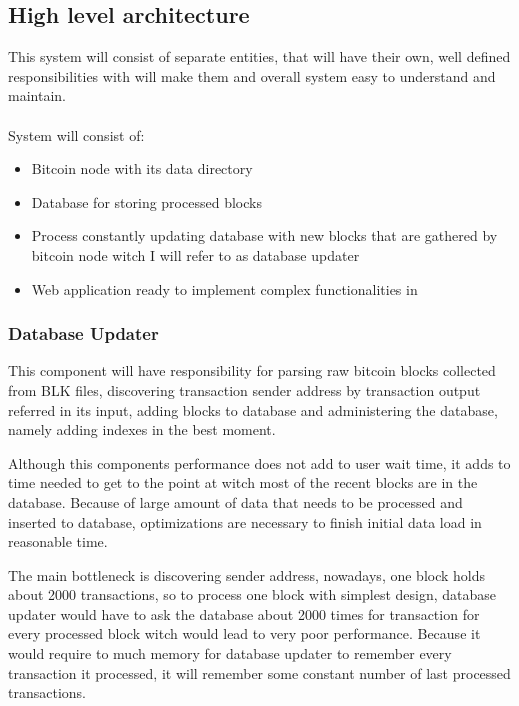 \documentclass[12pt, en, eng]{mgr}
\begin{document}
\subsection{High level architecture}
This system will consist of separate entities, that will have their own, well defined responsibilities with will make them and overall system easy to understand and maintain.
\\
\\
System will consist of:
\begin{itemize}
\item
Bitcoin node with its data directory
\item
Database for storing processed blocks
\item
Process constantly updating database with new blocks that are gathered by bitcoin node witch I will refer to as database updater
\item
Web application ready to implement complex functionalities in
\end{itemize}

\subsubsection{Database Updater}
This component will have responsibility for parsing raw bitcoin blocks collected from BLK files, discovering transaction sender address by transaction output referred in its input, adding blocks to database and administering the database, namely adding indexes in the best moment.

Although this components performance does not add to user wait time, it adds to time needed to get to the point at witch most of the recent blocks are in the database. Because of large amount of data that needs to be processed and inserted to database, optimizations are necessary to finish initial data load in reasonable time.

The main bottleneck is discovering sender address, nowadays, one block holds about 2000 transactions, so to process one block with simplest design, database updater would have to ask the database about 2000 times for transaction for every processed block witch would lead to very poor performance. Because it would require to much memory for database updater to remember every transaction it processed, it will remember some constant number of last processed transactions.
\end{document}
